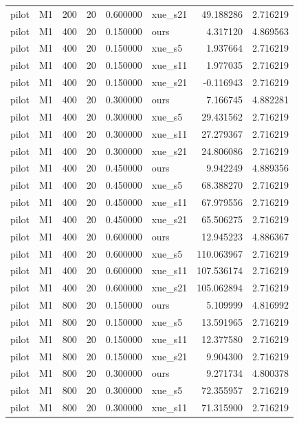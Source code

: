 \begin{longtable}{llrrrlrr}
pilot & M1 & 200 & 20 & 0.600000 & xue\_s21 & 49.188286 & 2.716219 \\
pilot & M1 & 400 & 20 & 0.150000 & ours & 4.317120 & 4.869563 \\
pilot & M1 & 400 & 20 & 0.150000 & xue\_s5 & 1.937664 & 2.716219 \\
pilot & M1 & 400 & 20 & 0.150000 & xue\_s11 & 1.977035 & 2.716219 \\
pilot & M1 & 400 & 20 & 0.150000 & xue\_s21 & -0.116943 & 2.716219 \\
pilot & M1 & 400 & 20 & 0.300000 & ours & 7.166745 & 4.882281 \\
pilot & M1 & 400 & 20 & 0.300000 & xue\_s5 & 29.431562 & 2.716219 \\
pilot & M1 & 400 & 20 & 0.300000 & xue\_s11 & 27.279367 & 2.716219 \\
pilot & M1 & 400 & 20 & 0.300000 & xue\_s21 & 24.806086 & 2.716219 \\
pilot & M1 & 400 & 20 & 0.450000 & ours & 9.942249 & 4.889356 \\
pilot & M1 & 400 & 20 & 0.450000 & xue\_s5 & 68.388270 & 2.716219 \\
pilot & M1 & 400 & 20 & 0.450000 & xue\_s11 & 67.979556 & 2.716219 \\
pilot & M1 & 400 & 20 & 0.450000 & xue\_s21 & 65.506275 & 2.716219 \\
pilot & M1 & 400 & 20 & 0.600000 & ours & 12.945223 & 4.886367 \\
pilot & M1 & 400 & 20 & 0.600000 & xue\_s5 & 110.063967 & 2.716219 \\
pilot & M1 & 400 & 20 & 0.600000 & xue\_s11 & 107.536174 & 2.716219 \\
pilot & M1 & 400 & 20 & 0.600000 & xue\_s21 & 105.062894 & 2.716219 \\
pilot & M1 & 800 & 20 & 0.150000 & ours & 5.109999 & 4.816992 \\
pilot & M1 & 800 & 20 & 0.150000 & xue\_s5 & 13.591965 & 2.716219 \\
pilot & M1 & 800 & 20 & 0.150000 & xue\_s11 & 12.377580 & 2.716219 \\
pilot & M1 & 800 & 20 & 0.150000 & xue\_s21 & 9.904300 & 2.716219 \\
pilot & M1 & 800 & 20 & 0.300000 & ours & 9.271734 & 4.800378 \\
pilot & M1 & 800 & 20 & 0.300000 & xue\_s5 & 72.355957 & 2.716219 \\
pilot & M1 & 800 & 20 & 0.300000 & xue\_s11 & 71.315900 & 2.716219 \\

\end{longtable}
